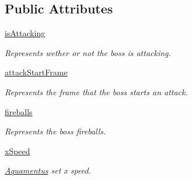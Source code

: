\subsection*{Public Attributes}
\begin{DoxyCompactItemize}
\item 
\mbox{\label{classactor_1_1aquamentus_1_1_aquamentus_ad37d613a7b0aff59695801ed84691959}} 
\hyperlink{classactor_1_1aquamentus_1_1_aquamentus_ad37d613a7b0aff59695801ed84691959}{is\+Attacking}
\begin{DoxyCompactList}\small\item\em Represents wether or not the boss is attacking. \end{DoxyCompactList}\item 
\mbox{\label{classactor_1_1aquamentus_1_1_aquamentus_adc3d75725497270071e563121cb687e2}} 
\hyperlink{classactor_1_1aquamentus_1_1_aquamentus_adc3d75725497270071e563121cb687e2}{attack\+Start\+Frame}
\begin{DoxyCompactList}\small\item\em Represents the frame that the boss starts an attack. \end{DoxyCompactList}\item 
\mbox{\label{classactor_1_1aquamentus_1_1_aquamentus_a3789eb3b652e8956c8215c444416de8c}} 
\hyperlink{classactor_1_1aquamentus_1_1_aquamentus_a3789eb3b652e8956c8215c444416de8c}{fireballs}
\begin{DoxyCompactList}\small\item\em Represents the boss\textquotesingle{} fireballs. \end{DoxyCompactList}\item 
\mbox{\label{classactor_1_1aquamentus_1_1_aquamentus_a72a68cb13edf22766de1bb935d77b477}} 
\hyperlink{classactor_1_1aquamentus_1_1_aquamentus_a72a68cb13edf22766de1bb935d77b477}{x\+Speed}
\begin{DoxyCompactList}\small\item\em \hyperlink{classactor_1_1aquamentus_1_1_aquamentus}{Aquamentus}\textquotesingle{} set x speed. \end{DoxyCompactList}\item 
\mbox{\label{classactor_1_1aquamentus_1_1_aquamentus_a590144e96f88385400ac90281bb281c8}} 

\end{DoxyCompactItemize}
